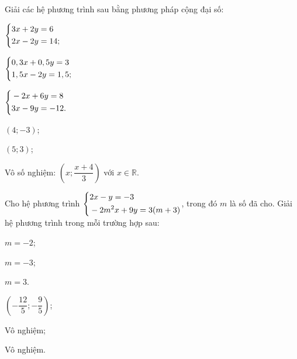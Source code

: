 \begin{baitap}[1.7]
    Giải các hệ phương trình sau bằng phương pháp cộng đại số:
    \begin{listEX}[2]
        \item $\left\{\begin{aligned}&3x + 2y = 6 \\ &2x - 2y = 14;\end{aligned}\right.$
        \item $\left\{\begin{aligned}&0,3x + 0,5y = 3 \\ &1,5x - 2y = 1,5;\end{aligned}\right.$ 
        \item $\left\{\begin{aligned}&-2x + 6y = 8 \\ &3x - 9y = -12.\end{aligned}\right.$
    \end{listEX}
    \doicot
    \huongdan
    \begin{listEX}
    	\item $(4;-3)$;
    	\item $(5;3)$;
    	\item Vô số nghiệm: $\left(x;\dfrac{x+4}{3}\right)$ với $x\in\mathbb{R}$.
    \end{listEX}
\end{baitap}

\begin{baitap}[1.8]
    Cho hệ phương trình $\left\{\begin{aligned}&2x - y = -3 \\ &-2m^2x + 9y = 3(m + 3)\end{aligned}\right.$, trong đó $m$ là số đã cho. Giải hệ phương trình trong mỗi trường hợp sau:
    \begin{listEX}[3]
        \item $m = -2$;
        \item $m = -3$;
        \item $m = 3$.
    \end{listEX}
    \doicot
    \huongdan
    \begin{listEX}
    	\item $\left(-\dfrac{12}{5};-\dfrac{9}{5}\right)$;
    	\item Vô nghiệm;
    	\item Vô nghiệm.
    \end{listEX}
\end{baitap}

